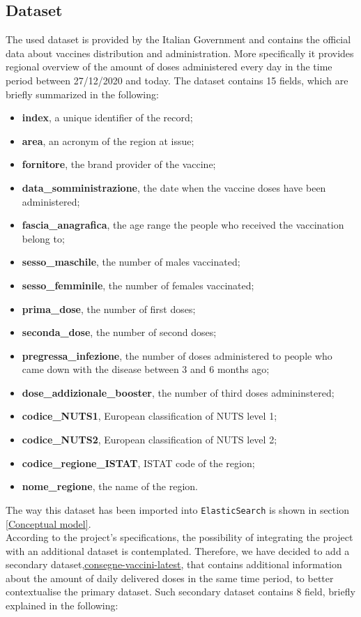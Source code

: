 \documentclass{article}
\begin{document}
\subsection{Dataset}
The used dataset is provided by the Italian Government and contains the official data about vaccines distribution and administration. More specifically it provides regional overview of the amount of doses administered every day in the time period between 27/12/2020 and today.
The dataset contains 15 fields, which are briefly summarized in the following:
\begin{itemize}
    \item \textbf{index}, a unique identifier of the record;
    \item \textbf{area}, an acronym of the region at issue;
    \item \textbf{fornitore}, the brand provider of the vaccine; 
    \item \textbf{data\_somministrazione}, the date when the vaccine doses have been administered;
    \item \textbf{fascia\_anagrafica}, the age range the people who received the vaccination belong to;
    \item \textbf{sesso\_maschile}, the number of males vaccinated;
    \item \textbf{sesso\_femminile}, the number of females vaccinated;
    \item \textbf{prima\_dose}, the number of first doses;
    \item \textbf{seconda\_dose}, the number of second doses;
    \item \textbf{pregressa\_infezione}, the number of doses administered to people who came down with the disease between 3 and 6 months ago;
    \item \textbf{dose\_addizionale\_booster}, the number of third doses admininstered;
    \item \textbf{codice\_NUTS1}, European classification of NUTS level 1;
    \item \textbf{codice\_NUTS2}, European classification of NUTS level 2;
    \item \textbf{codice\_regione\_ISTAT}, ISTAT code of the region;
    \item \textbf{nome\_regione}, the name of the region.
\end{itemize}
The way this dataset has been imported into \verb|ElasticSearch| is shown in section \ref{Conceptual model}.\\
According to the project's specifications, the possibility of integrating the project with an additional dataset is contemplated. Therefore, we have decided to add a secondary dataset,\href{https://github.com/italia/covid19-opendata-vaccini/blob/master/dati/consegne-vaccini-latest.csv}{consegne-vaccini-latest}, that contains additional information about the amount of daily delivered doses in the same time period, to better contextualise the primary dataset. Such secondary dataset contains 8 field, briefly explained in the following:
\end{document}
